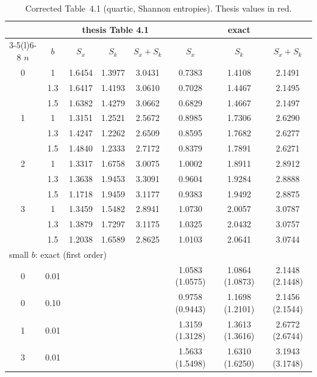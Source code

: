 \documentclass[11pt,a4paper]{article}
\newcommand{\Th}[1]{\textcolor{BrickRed}{#1}}
\begin{document}
\begin{table}[h]
\centering\small
\begin{tabular}{@{}cc ccc ccc@{}}
\toprule
& & \multicolumn{3}{c}{thesis Table 4.1} & \multicolumn{3}{c}{exact}\\
\cmidrule(lr){3-5}\cmidrule(l){6-8}
$n$ & $b$ & $S_x$ & $S_k$ & $S_x+S_k$ & $S_x$ & $S_k$ & $S_x+S_k$\\
\midrule
0 & 1   & \Th{1.6454} & \Th{1.3977} & \Th{3.0431} & 0.7383 & 1.4108 & 2.1491\\
  & 1.3 & \Th{1.6417} & \Th{1.4193} & \Th{3.0610} & 0.7028 & 1.4467 & 2.1495\\
  & 1.5 & \Th{1.6382} & \Th{1.4279} & \Th{3.0662} & 0.6829 & 1.4667 & 2.1497\\
1 & 1   & \Th{1.3151} & \Th{1.2521} & \Th{2.5672} & 0.8985 & 1.7306 & 2.6290\\
  & 1.3 & \Th{1.4247} & \Th{1.2262} & \Th{2.6509} & 0.8595 & 1.7682 & 2.6277\\
  & 1.5 & \Th{1.4840} & \Th{1.2333} & \Th{2.7172} & 0.8379 & 1.7891 & 2.6271\\
2 & 1   & \Th{1.3317} & \Th{1.6758} & \Th{3.0075} & 1.0002 & 1.8911 & 2.8912\\
  & 1.3 & \Th{1.3638} & \Th{1.9453} & \Th{3.3091} & 0.9604 & 1.9284 & 2.8888\\
  & 1.5 & \Th{1.1718} & \Th{1.9459} & \Th{3.1177} & 0.9383 & 1.9492 & 2.8875\\
3 & 1   & \Th{1.3459} & \Th{1.5482} & \Th{2.8941} & 1.0730 & 2.0057 & 3.0787\\
  & 1.3 & \Th{1.3879} & \Th{1.7297} & \Th{3.1175} & 1.0325 & 2.0432 & 3.0757\\
  & 1.5 & \Th{1.2038} & \Th{1.6589} & \Th{2.8625} & 1.0103 & 2.0641 & 3.0744\\
\midrule
\multicolumn{8}{l}{small $b$: exact (first order) \quad [$S_x+S_k\ge1+\ln\pi=2.1447$ in all cases]}\\
0 & 0.01 & \multicolumn{3}{c}{} & 1.0583 (1.0575) & 1.0864 (1.0873) & 2.1448 (2.1448)\\
0 & 0.10 & \multicolumn{3}{c}{} & 0.9758 (0.9443) & 1.1698 (1.2101) & 2.1456 (2.1544)\\
1 & 0.01 & \multicolumn{3}{c}{} & 1.3159 (1.3128) & 1.3613 (1.3616) & 2.6772 (2.6744)\\
3 & 0.01 & \multicolumn{3}{c}{} & 1.5633 (1.5498) & 1.6310 (1.6250) & 3.1943 (3.1748)\\
\bottomrule
\end{tabular}
\caption{Corrected Table~4.1 (quartic, Shannon entropies). Thesis values in red.}
\label{tab:q41}
\end{table}
\end{document}
